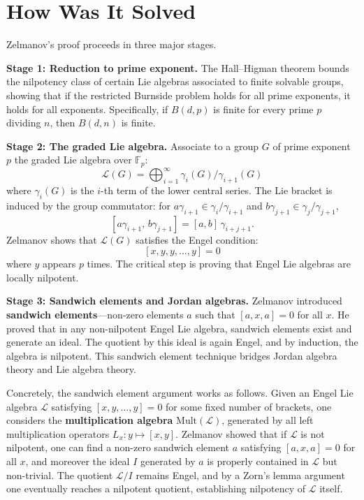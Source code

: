 \section{How Was It Solved}

Zelmanov's proof proceeds in three major stages.

\textbf{Stage 1: Reduction to prime exponent.}
The Hall--Higman theorem bounds the nilpotency class of certain Lie
algebras associated to finite solvable groups, showing that if the
restricted Burnside problem holds for all prime exponents, it holds
for all exponents.  Specifically, if $B(d,p)$ is finite for every
prime $p$ dividing $n$, then $B(d,n)$ is finite.

\textbf{Stage 2: The graded Lie algebra.}
Associate to a group $G$ of prime exponent $p$ the graded Lie
algebra over $\mathbb{F}_p$:
\[
  \mathcal{L}(G)
  = \bigoplus_{i=1}^{\infty} \gamma_i(G)/\gamma_{i+1}(G)
\]
where $\gamma_i(G)$ is the $i$-th term of the lower central
series.  The Lie bracket is induced by the group commutator: for
$a\gamma_{i+1}\in\gamma_i/\gamma_{i+1}$ and
$b\gamma_{j+1}\in\gamma_j/\gamma_{j+1}$,
\[
  [a\gamma_{i+1},\, b\gamma_{j+1}]
  = [a,b]\,\gamma_{i+j+1}.
\]
Zelmanov shows that $\mathcal{L}(G)$ satisfies the Engel condition:
\[
  [x, y, y, \dots, y] = 0
\]
where $y$ appears $p$ times.  The critical step is proving that
Engel Lie algebras are locally nilpotent.

\textbf{Stage 3: Sandwich elements and Jordan algebras.}
Zelmanov introduced \textbf{sandwich elements}---non-zero elements
$a$ such that $[a, x, a] = 0$ for all $x$.  He proved that in any
non-nilpotent Engel Lie algebra, sandwich elements exist and
generate an ideal.  The quotient by this ideal is again Engel, and
by induction, the algebra is nilpotent.  This sandwich element
technique bridges Jordan algebra theory and Lie algebra theory.

Concretely, the sandwich element argument works as follows.  Given
an Engel Lie algebra $\mathcal{L}$ satisfying
$[x,y,\dots,y]=0$ for some fixed number of brackets, one considers
the \textbf{multiplication algebra} $\mathrm{Mult}(\mathcal{L})$,
generated by all left multiplication operators
$L_x\colon y\mapsto [x,y]$.  Zelmanov showed that if
$\mathcal{L}$ is not nilpotent, one can find a non-zero sandwich
element $a$ satisfying $[a,x,a]=0$ for all $x$, and moreover the
ideal $I$ generated by $a$ is properly contained in $\mathcal{L}$
but non-trivial.  The quotient $\mathcal{L}/I$ remains Engel, and
by a Zorn's lemma argument one eventually reaches a nilpotent
quotient, establishing nilpotency of $\mathcal{L}$ itself.

